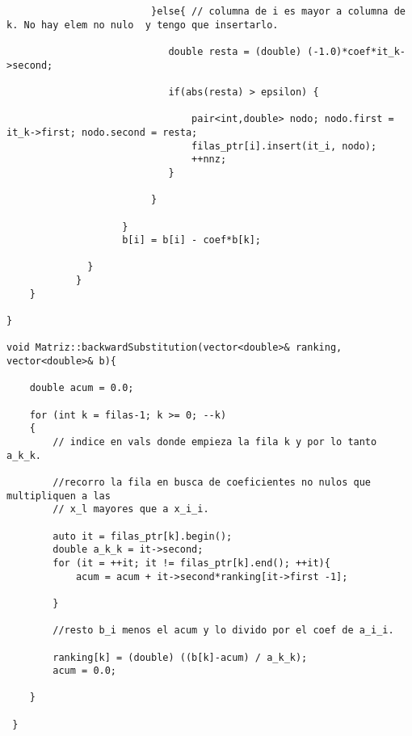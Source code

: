 \begin{lstlisting}
                         }else{ // columna de i es mayor a columna de k. No hay elem no nulo  y tengo que insertarlo.

                            double resta = (double) (-1.0)*coef*it_k->second;

                            if(abs(resta) > epsilon) {
                               
                                pair<int,double> nodo; nodo.first = it_k->first; nodo.second = resta;
                                filas_ptr[i].insert(it_i, nodo);
                                ++nnz;
                            }  

                         }
      
                    }
                    b[i] = b[i] - coef*b[k];

              }
            }  
    }

}

void Matriz::backwardSubstitution(vector<double>& ranking, vector<double>& b){

    double acum = 0.0;

    for (int k = filas-1; k >= 0; --k)
    {
        // indice en vals donde empieza la fila k y por lo tanto a_k_k.       

        //recorro la fila en busca de coeficientes no nulos que multipliquen a las
        // x_l mayores que a x_i_i.

        auto it = filas_ptr[k].begin();
        double a_k_k = it->second;
        for (it = ++it; it != filas_ptr[k].end(); ++it){
            acum = acum + it->second*ranking[it->first -1];

        }

        //resto b_i menos el acum y lo divido por el coef de a_i_i.

        ranking[k] = (double) ((b[k]-acum) / a_k_k);
        acum = 0.0;

    }

 }
 
\end{lstlisting}

\newpage

